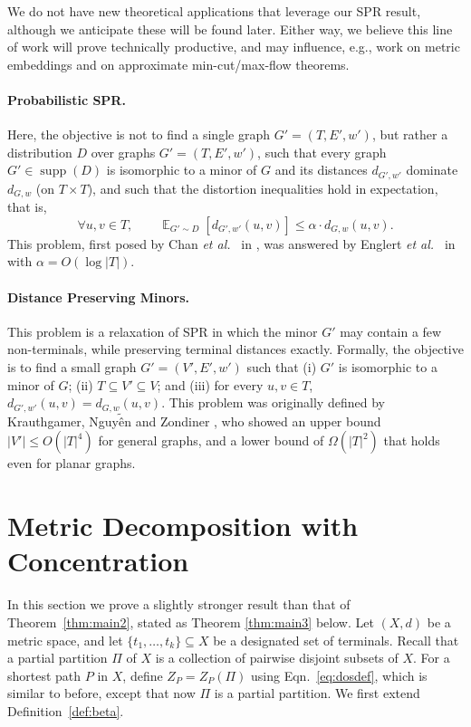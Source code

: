 \documentclass[twoside,leqno,twocolumn]{article}
\DeclareMathOperator{\supp}{supp}
\DeclareMathOperator*{\EX}{{\mathbb E}}
\newcommand{\etal}{{\em et al.\ }\xspace}
\providecommand{\aset}[1]{\{#1\}}
\begin{document}
We do not have new theoretical applications that leverage our SPR result,
although we anticipate these will be found later. 
Either way, we believe this line of work will prove technically productive,
and may influence, e.g., work on metric embeddings 
and on approximate min-cut/max-flow theorems.

\paragraph{Probabilistic SPR.}
Here, the objective is not to find a single graph $G'=(T,E',w')$,
but rather a distribution $D$ over graphs $G'=(T,E',w')$,
such that every graph $G' \in \supp(D)$ is isomorphic to a minor of $G$
and its distances $d_{G',w'}$ dominate $d_{G,w}$ (on $T \times T$),
and such that the distortion inequalities hold in expectation, that is,
$$\forall u,v \in T,\qquad \EX_{G'\sim D}[d_{G',w'}(u,v)] \le \alpha\cdot d_{G,w}(u,v).$$
This problem, first posed by Chan \etal in \cite{CXKR06}, was answered by Englert \etal in \cite{EGKRTT10}
with $\alpha = O(\log |T|)$.

\paragraph{Distance Preserving Minors.} 
This problem is a relaxation of SPR in which the minor $G'$ may contain a few non-terminals,
while preserving terminal distances exactly.
Formally, the objective is to find a small graph $G' = (V',E',w')$ such that
(i) $G'$ is isomorphic to a minor of $G$;
(ii) $T \subseteq V' \subseteq V$; and
(iii) for every $u,v \in T$,\ $d_{G',w'}(u,v) = d_{G,w}(u,v)$.
This problem was originally defined by Krauthgamer, Nguy$\tilde{\mbox{\^{e}}}$n and Zondiner \cite{KNZ14},
who showed an upper bound $|V'|\leq O(|T|^4)$ for general graphs,
and a lower bound of $\Omega(|T|^2)$ that holds even for planar graphs. 


\section{Metric Decomposition with Concentration} \label{sec:main2}

In this section we prove a slightly stronger result than that of Theorem~\ref{thm:main2},
stated as Theorem \ref{thm:main3} below. 
Let $(X,d)$ be a metric space, and let $\aset{t_1,\ldots, t_k}\subseteq X$ 
be a designated set of terminals.
Recall that a partial partition $\Pi$ of $X$ 
is a collection of pairwise disjoint subsets of $X$. 
For a shortest path $P$ in $X$,
define $Z_P=Z_P(\Pi)$ using Eqn.~\eqref{eq:dosdef},
which is similar to before, except that now $\Pi$ is a partial partition.
We first extend Definition~\ref{def:beta}.
\end{document}
